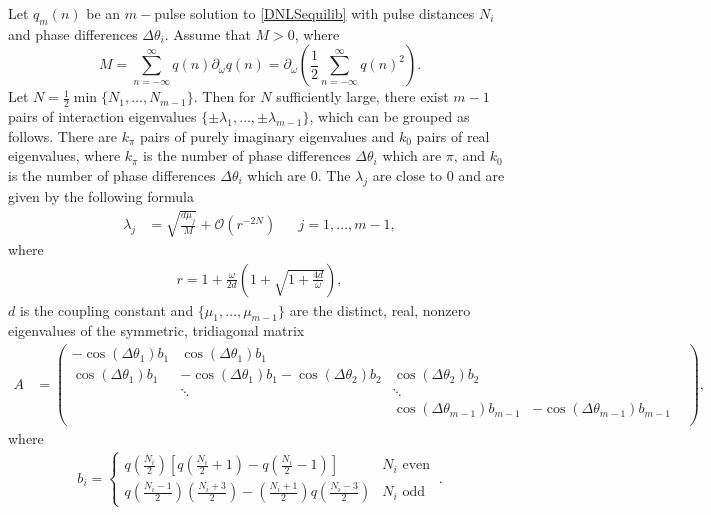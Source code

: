 \documentclass[thesis.tex]{subfiles}
\begin{document}
\begin{theorem}\label{DNLSeigtheorem}
Let $q_m(n)$ be an $m-$pulse solution to \cref{DNLSequilib} with pulse distances $N_i$ and phase differences $\Delta\theta_i$. Assume that $M > 0$, where
\[
M = \sum_{n=-\infty}^\infty q(n) \partial_\omega q(n) = \partial_\omega \left( \frac{1}{2} \sum_{n=-\infty}^\infty q(n)^2 \right).
\]
Let $N = \frac{1}{2} \min\{ N_1, \dots, N_{m-1}\}$. Then for $N$ sufficiently large, there exist $m-1$ pairs of interaction eigenvalues $\{\pm \lambda_1, \dots, \pm \lambda_{m-1}\}$, which can be grouped as follows. There are $k_\pi$ pairs of purely imaginary eigenvalues and $k_0$ pairs of real eigenvalues, where $k_\pi$ is the number of phase differences $\Delta\theta_i$ which are $\pi$, and $k_0$ is the number of phase differences $\Delta\theta_i$ which are $0$. The $\lambda_j$ are close to 0 and are given by the following formula
\begin{align}\label{eigsDNLS}
\lambda_j &= \sqrt{\frac{d \mu_j}{M}} + \mathcal{O}(r^{-2N}) && j = 1, \dots, m-1,
\end{align}
where
\begin{align}\label{eigr}
r = 1 + \frac{\omega}{2 d} \left( 1 + \sqrt{1 + \frac{4 d}{\omega}} \right),
\end{align}
$d$ is the coupling constant and $\{ \mu_1, \dots, \mu_{m-1} \}$ are the distinct, real, nonzero eigenvalues of the symmetric, tridiagonal matrix
\begin{align}\label{DNLSmatrixA}
A &= \begin{pmatrix}
-\cos(\Delta\theta_1) b_1 & \cos(\Delta\theta_1) b_1 & & &  \\
\cos(\Delta\theta_1) b_1 & -\cos(\Delta\theta_1) b_1 - \cos(\Delta\theta_2) b_2 & \cos(\Delta\theta_2) b_2 \\
& \ddots & \ddots \\
& &  \cos(\Delta\theta_{m-1}) b_{m-1} & -\cos(\Delta\theta_{m-1}) b_{m-1}  \\
\end{pmatrix},
\end{align}
where
\begin{align}\label{bieq}
b_i = \begin{cases}
q\left(\frac{N_i}{2}\right) \left[ q\left(\frac{N_i}{2} + 1\right) - q\left(\frac{N_i}{2} - 1\right) \right] & N_i \text{ even} \\
q\left(\frac{N_i-1}{2}\right)\left(\frac{N_i+3}{2}\right) 
- \left(\frac{N_i+1}{2}\right)q\left(\frac{N_i-3}{2}\right) & N_i \text{ odd}
\end{cases} \:.
\end{align}
\end{theorem}
\end{document}
